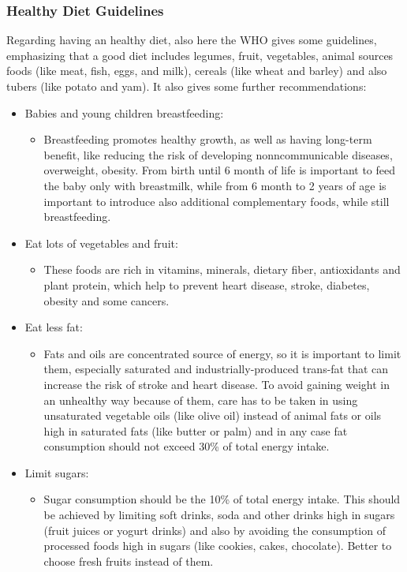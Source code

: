 \subsubsection{Healthy Diet Guidelines}
Regarding having an healthy diet, also here the WHO gives some guidelines, emphasizing that a good diet includes legumes, fruit, vegetables, animal sources foods (like meat, fish, eggs, and milk), cereals (like wheat and barley) and also tubers (like potato and yam). It also gives some further recommendations\cite{WhoHealthyDietGuidelines}: 

\begin{itemize}[nosep] %
    \item Babies and young children breastfeeding:
          \begin{itemize}[nosep]
              \item Breastfeeding promotes healthy growth, as well as having long-term benefit, like reducing the risk of developing nonncommunicable diseases, overweight, obesity. From birth until 6 month of life is important to feed the baby only with breastmilk, while from 6 month to 2 years of age is important to introduce also additional complementary foods, while still breastfeeding.
          \end{itemize}
          
    \item Eat lots of vegetables and fruit:
          \begin{itemize}[nosep]
              \item These foods are rich in vitamins, minerals, dietary fiber, antioxidants and plant protein, which help to prevent heart disease, stroke, diabetes, obesity and some cancers.
          \end{itemize}
          
    \item Eat less fat:
          \begin{itemize}[nosep]
              \item Fats and oils are concentrated source of energy, so it is important to limit them, especially saturated and industrially-produced trans-fat that can increase the risk of stroke and heart disease. To avoid gaining weight in an unhealthy way because of them, care has to be taken in using unsaturated vegetable oils (like olive oil) instead of animal fats or oils high in saturated fats (like butter or palm) and in any case fat consumption should not exceed 30\% of total energy intake.
          \end{itemize}
          
    \item Limit sugars:
          \begin{itemize}[nosep]
              \item Sugar consumption should be the 10\% of total energy intake. This should be achieved by limiting soft drinks, soda and other drinks high in sugars (fruit juices or yogurt drinks) and also by avoiding the consumption of processed foods high in sugars (like cookies, cakes, chocolate). Better to choose fresh fruits instead of them.
          \end{itemize}
\end{itemize}


